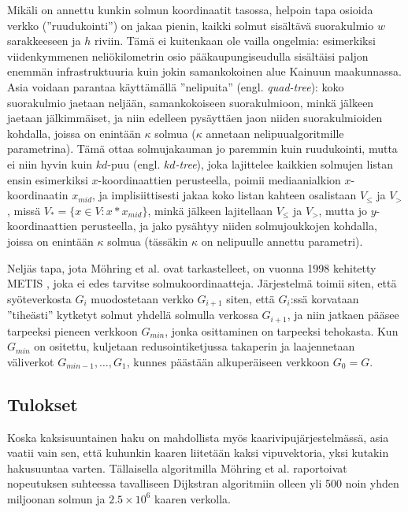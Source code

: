 \documentclass[finnish]{tktltiki2}
\theoremstyle{definition}
\theoremstyle{remark}
\begin{document}
 Mikäli on annettu kunkin solmun koordinaatit tasossa, helpoin tapa osioida verkko (''ruudukointi'') on jakaa pienin, kaikki solmut sisältävä suorakulmio $w$ sarakkeeseen ja $h$ riviin. Tämä ei kuitenkaan ole vailla ongelmia: esimerkiksi viidenkymmenen neliökilometrin osio pääkaupungiseudulla sisältäisi paljon enemmän infrastruktuuria kuin jokin samankokoinen alue Kainuun maakunnassa. Asia voidaan parantaa käyttämällä ''nelipuita'' (engl. \textit{quad-tree}): koko suorakulmio jaetaan neljään, samankokoiseen suorakulmioon, minkä jälkeen jaetaan jälkimmäiset, ja niin edelleen pysäyttäen jaon niiden suorakulmioiden kohdalla, joissa on enintään $\kappa$ solmua ($\kappa$ annetaan nelipuualgoritmille parametrina). Tämä ottaa solmujakauman jo paremmin kuin ruudukointi, mutta ei niin hyvin kuin $kd$-puu (engl. \textit{$kd$-tree}), joka lajittelee kaikkien solmujen listan ensin esimerkiksi $x$-koordinaattien perusteella, poimii mediaanialkion $x$-koordinaatin $x_{mid}$, ja implisiittisesti jakaa koko listan kahteen osalistaan $V_{\leq}$ ja $V_{>}$, missä $V_{\ast} = \{ x \in V \colon x \ast x_{mid}\}$, minkä jälkeen lajitellaan $V_{\leq}$ ja $V_{>}$, mutta jo $y$-koordinaattien perusteella, ja jako pysähtyy niiden solmujoukkojen kohdalla, joissa on enintään $\kappa$ solmua (tässäkin $\kappa$ on nelipuulle annettu parametri).
 
 Neljäs tapa, jota Möhring et al. ovat tarkastelleet, on vuonna 1998 kehitetty METIS \cite{Karypis98}, joka ei edes tarvitse solmukoordinaatteja. Järjestelmä toimii siten, että syöteverkosta $G_i$ muodostetaan verkko $G_{i + 1}$ siten, että $G_i$:ssä korvataan ''tiheästi'' kytketyt solmut yhdellä solmulla verkossa $G_{i + 1}$, ja niin jatkaen pääsee tarpeeksi pieneen verkkoon $G_{min}$, jonka osittaminen on tarpeeksi tehokasta. Kun $G_{min}$ on ositettu, kuljetaan redusointiketjussa takaperin ja laajennetaan väliverkot $G_{min - 1}, \dots, G_1$, kunnes päästään alkuperäiseen verkkoon $G_0 = G$.
 
\subsection{Tulokset}
Koska kaksisuuntainen haku on mahdollista myös kaarivipujärjestelmässä, asia vaatii vain sen, että kuhunkin kaaren liitetään kaksi vipuvektoria, yksi kutakin hakusuuntaa varten. Tällaisella algoritmilla Möhring et al. raportoivat nopeutuksen suhteessa tavalliseen Dijkstran algoritmiin olleen yli 500 noin yhden miljoonan solmun ja $2.5 \times 10^6$ kaaren verkolla.
 
\end{document}
